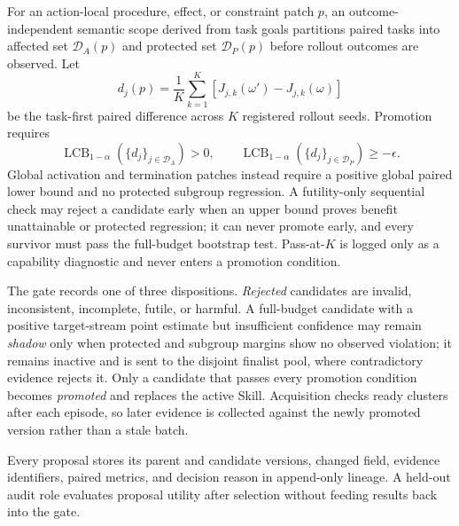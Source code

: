 {\color{red}For an action-local procedure, effect, or constraint patch $p$, an outcome-independent semantic scope derived from task goals partitions paired tasks into affected set $\mathcal{D}_{A}(p)$ and protected set $\mathcal{D}_{P}(p)$ before rollout outcomes are observed. Let
\begin{equation}
    d_j(p)=\frac{1}{K}\sum_{k=1}^{K}
    \left[J_{j,k}(\omega')-J_{j,k}(\omega)\right]
\end{equation}
be the task-first paired difference across $K$ registered rollout seeds. Promotion requires
\begin{equation}
    \operatorname{LCB}_{1-\alpha}\!\left(\{d_j\}_{j\in\mathcal{D}_{A}}\right)>0,
    \qquad
    \operatorname{LCB}_{1-\alpha}\!\left(\{d_j\}_{j\in\mathcal{D}_{P}}\right)
    \geq-\epsilon.
\end{equation}
Global activation and termination patches instead require a positive global paired lower bound and no protected subgroup regression. A futility-only sequential check may reject a candidate early when an upper bound proves benefit unattainable or protected regression; it can never promote early, and every survivor must pass the full-budget bootstrap test. Pass-at-$K$ is logged only as a capability diagnostic and never enters a promotion condition.}

{\color{red}The gate records one of three dispositions. \emph{Rejected} candidates are invalid, inconsistent, incomplete, futile, or harmful. A full-budget candidate with a positive target-stream point estimate but insufficient confidence may remain \emph{shadow} only when protected and subgroup margins show no observed violation; it remains inactive and is sent to the disjoint finalist pool, where contradictory evidence rejects it. Only a candidate that passes every promotion condition becomes \emph{promoted} and replaces the active Skill. Acquisition checks ready clusters after each episode, so later evidence is collected against the newly promoted version rather than a stale batch.}

Every proposal stores its parent and candidate versions, changed field, evidence identifiers, paired metrics, and decision reason in append-only lineage. A held-out audit role evaluates proposal utility after selection without feeding results back into the gate. 
